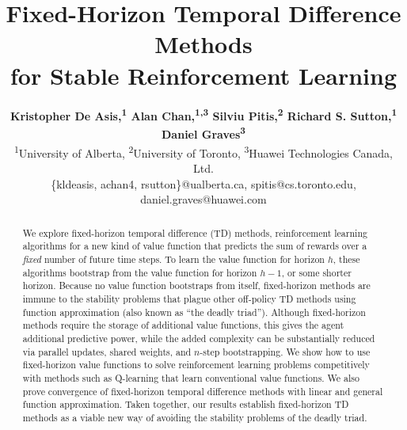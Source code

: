 \documentclass[letterpaper]{article} %
\title{Fixed-Horizon Temporal Difference Methods\\for Stable Reinforcement Learning}
\author{\Large \textbf{Kristopher De Asis,\textsuperscript{\rm 1} Alan Chan,\textsuperscript{\rm 1,3} Silviu Pitis,\textsuperscript{\rm 2} Richard S. Sutton,\textsuperscript{\rm 1} Daniel Graves\textsuperscript{\rm 3}}\\
\textsuperscript{\rm 1}University of Alberta, \textsuperscript{\rm 2}University of Toronto, \textsuperscript{\rm 3}Huawei Technologies Canada, Ltd.\\
\{kldeasis, achan4, rsutton\}@ualberta.ca, spitis@cs.toronto.edu, daniel.graves@huawei.com
}
\begin{document}
\maketitle

\begin{abstract}
We explore fixed-horizon temporal difference (TD) methods, reinforcement learning algorithms for a new kind of value function that predicts the sum of rewards over a \textit{fixed} number of future time steps. To learn the value function for horizon $h$, these algorithms bootstrap from the value function for horizon $h-1$, or some shorter horizon. Because no value function bootstraps from itself, fixed-horizon methods are immune to the stability problems that plague other off-policy TD methods using function approximation (also known as ``the deadly triad''). Although fixed-horizon methods require the storage of additional value functions, this gives the agent additional predictive power, while the added complexity can be substantially reduced via parallel updates, shared weights, and $n$-step bootstrapping. We show how to use fixed-horizon value functions to solve reinforcement learning problems competitively with methods such as Q-learning that learn conventional value functions. We also prove convergence of fixed-horizon temporal difference methods with linear and general function approximation. Taken together, our results establish fixed-horizon TD methods as a viable new way of avoiding the stability problems of the deadly triad.
\end{abstract}
\end{document}

